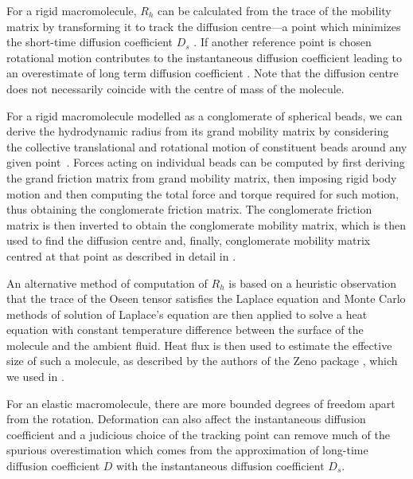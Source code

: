 \documentclass[physics]{doctoral}
\begin{document}
For a rigid macromolecule, $R_h$ can be calculated from the trace of the mobility matrix by transforming it to track the diffusion centre---a point which minimizes the short-time diffusion coefficient $D_{s}$ \cite{Zuk_2018}.
If another reference point is chosen rotational motion contributes to the instantaneous diffusion coefficient leading to an overestimate of long term diffusion coefficient \cite{Cichocki_2015}.
Note that the diffusion centre does not necessarily coincide with the centre of mass of the molecule.

For a rigid macromolecule modelled as a conglomerate of spherical beads, we can derive the hydrodynamic radius from its grand mobility matrix by considering the collective translational and rotational motion of constituent beads around any given point~\cite{Ekiel-Jezewska_2009}.
Forces acting on individual beads can be computed by first deriving the grand friction matrix from grand mobility matrix, then imposing rigid body motion and then computing the total force and torque required for such motion, thus obtaining the conglomerate friction matrix.
The conglomerate friction matrix is then inverted to obtain the conglomerate mobility matrix, which is then used to find the diffusion centre and, finally,  conglomerate mobility matrix centred at that point as described in detail in \textcite{Cichocki_2019}.

An alternative method of computation of $R_h$ is based on a heuristic observation that the trace of the Oseen tensor satisfies the Laplace equation and Monte Carlo methods of solution of Laplace's equation are then applied to solve a heat equation with constant temperature difference between the surface of the molecule and the ambient fluid.
Heat flux is then used to estimate the effective size of such a molecule, as described by the authors of the Zeno package \cite{Juba_2017}, which we used in \textcite{Waszkiewicz_2023_dna}.

For an elastic macromolecule, there are more bounded degrees of freedom apart from the rotation.
Deformation can also affect the instantaneous diffusion coefficient and a judicious choice of the tracking point can remove much of the spurious overestimation which comes from the approximation of long-time diffusion coefficient $D$ with the instantaneous diffusion coefficient $D_{s}$.
\end{document}
